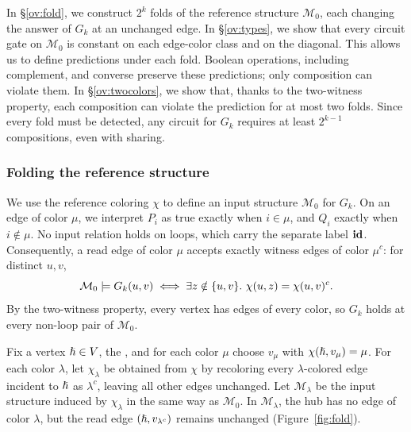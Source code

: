 In \S\ref{ov:fold}, we construct $2^k$ folds of the reference structure $\mathcal M_0$, each changing the answer of $G_k$ at an unchanged edge.
%
In \S\ref{ov:types}, we show that every circuit gate on $\mathcal M_0$ is constant on each edge-color class and on the diagonal. This allows us to define predictions under each fold.
Boolean operations, including complement, and converse preserve these predictions; only composition can violate them.
%
In \S\ref{ov:twocolors}, we show that, thanks to the two-witness property, each composition can violate the prediction for at most two folds. Since every fold must be detected, any circuit for $G_k$ requires at least $2^{k-1}$ compositions, even with sharing.
\fi
{}

\subsubsection{Folding the reference structure}\label{ov:outline}\label{ov:fold}

We use the reference coloring $\chi$ to define an input structure $\mathcal M_0$ for $G_k$.
On an edge of color $\mu$, we interpret $P_i$ as true exactly when $i\in\mu$, and $Q_i$ exactly when $i\notin\mu$. No input relation holds on loops, which carry the separate label $\mathbf{id}$.
Consequently, a read edge of color $\mu$ accepts exactly witness edges of color $\mu^c$: for distinct $u,v$,
\[
\mathcal M_0 \models G_k(u,v)\iff
\exists z \notin \{ u, v \}.\ \chi(u,z)=\chi(u,v)^c.
\]
By the two-witness property, every vertex
has edges of every color, so $G_k$ holds
at every non-loop pair of $\mathcal M_0$.

Fix a vertex $\hslash \in V$, the , and for each color $\mu$ choose $v_\mu$ with $\chi(\hslash,v_\mu)=\mu$.
%
For each color $\lambda$, let $\chi_\lambda$ be obtained from $\chi$ by recoloring every $\lambda$-colored edge incident to $\hslash$ as $\lambda^c$, leaving all other edges unchanged.
Let $\mathcal M_\lambda$ be the input structure induced by $\chi_\lambda$ in the same way as $\mathcal M_0$.
In $\mathcal M_\lambda$, the hub has no edge of color $\lambda$, but the read edge $(\hslash,v_{\lambda^c})$ remains unchanged (Figure~\ref{fig:fold}).

